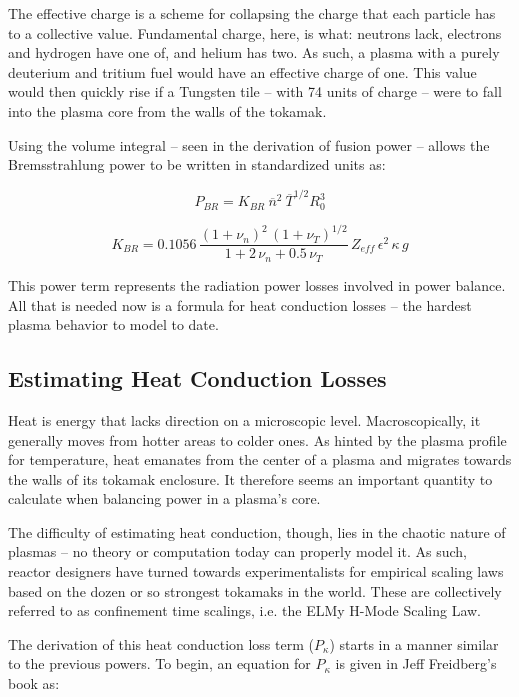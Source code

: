 The effective charge is a scheme for collapsing the charge that each particle has to a collective value. Fundamental charge, here, is what: neutrons lack, electrons and hydrogen have one of, and helium has two. As such, a plasma with a purely deuterium and tritium fuel would have an effective charge of one. This value would then quickly rise if a Tungsten tile -- with 74 units of charge -- were to fall into the plasma core from the walls of the tokamak.

Using the volume integral -- seen in the derivation of fusion power -- allows the Bremsstrahlung power to be written in standardized units as:

\begin{equation}
	\label{eq:pbr}
	P_{BR} = K_{BR} \ \overline n ^ 2 \ \overline T ^ {1/2} R_0^3 
\end{equation}

\begin{equation}
	K_{BR} = 0.1056 \, \frac{ (1+\nu_n)^2 \, (1+\nu_T)^{1/2} }{1+2 \, \nu_n + 0.5 \, \nu_T} \, Z_{eff} \, \epsilon^2 \, \kappa \, g
\end{equation}

This power term represents the radiation power losses involved in power balance. All that is needed now is a formula for heat conduction losses -- the hardest plasma behavior to model to date.

\subsection{Estimating Heat Conduction Losses}

Heat is energy that lacks direction on a microscopic level. Macroscopically, it generally moves from hotter areas to colder ones. As hinted by the plasma profile for temperature, heat emanates from the center of a plasma and migrates towards the walls of its tokamak enclosure. It therefore seems an important quantity to calculate when balancing power in a plasma's core.

The difficulty of estimating heat conduction, though, lies in the chaotic nature of plasmas -- no theory or computation today can properly model it. As such, reactor designers have turned towards experimentalists for empirical scaling laws based on the dozen or so strongest tokamaks in the world. These are collectively referred to as confinement time scalings, i.e. the ELMy H-Mode Scaling Law.

The derivation of this heat conduction loss term ($P_\kappa$) starts in a manner similar to the previous powers. To begin, an equation for $P_\kappa$ is given in Jeff Freidberg's book as:

